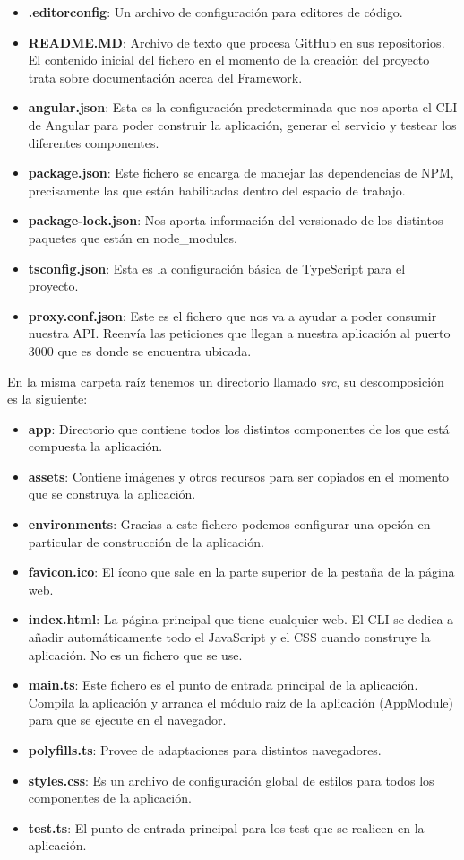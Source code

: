 \begin{itemize}
    \item \textbf{.editorconfig}: Un archivo de configuración para editores de código.
    \item \textbf{README.MD}: Archivo de texto que procesa GitHub en sus repositorios. El contenido inicial del fichero en el momento de la creación del proyecto trata sobre documentación acerca del Framework.
    \item \textbf{angular.json}: Esta es la configuración predeterminada que nos aporta el CLI de Angular para poder construir la aplicación, generar el servicio y testear los diferentes componentes.
    \item \textbf{package.json}: Este fichero se encarga de manejar las dependencias de NPM, precisamente las que están habilitadas dentro del espacio de trabajo.
    \item \textbf{package-lock.json}: Nos aporta información del versionado de los distintos paquetes que están en node\_modules.
    \item \textbf{tsconfig.json}: Esta es la configuración básica de TypeScript para el proyecto.
    \item \textbf{proxy.conf.json}: Este es el fichero que nos va a ayudar a poder consumir nuestra API. Reenvía las peticiones que llegan a nuestra aplicación al puerto 3000 que es donde se encuentra ubicada.
\end{itemize}
En la misma carpeta raíz tenemos un directorio llamado \textit{src}, su descomposición es la siguiente:

\begin{itemize}
    \item \textbf{app}: Directorio que contiene todos los distintos componentes de los que está compuesta la aplicación.
    \item \textbf{assets}: Contiene imágenes y otros recursos para ser copiados en el momento que se construya la aplicación.
    \item \textbf{environments}: Gracias a este fichero podemos configurar una opción en particular de construcción de la aplicación.
    \item \textbf{favicon.ico}: El ícono que sale en la parte superior de la pestaña de la página web.
    \item \textbf{index.html}: La página principal que tiene cualquier web. El CLI se dedica a añadir automáticamente todo el JavaScript y el CSS cuando construye la aplicación. No es un fichero que se use.
    \item \textbf{main.ts}: Este fichero es el punto de entrada principal de la aplicación. Compila la aplicación y arranca el módulo raíz de la aplicación (AppModule) para que se ejecute en el navegador.
    \item \textbf{polyfills.ts}: Provee de adaptaciones para distintos navegadores.
    \item \textbf{styles.css}: Es un archivo de configuración global de estilos para todos los componentes de la aplicación.
    \item \textbf{test.ts}: El punto de entrada principal para los test que se realicen en la aplicación.
\end{itemize}

